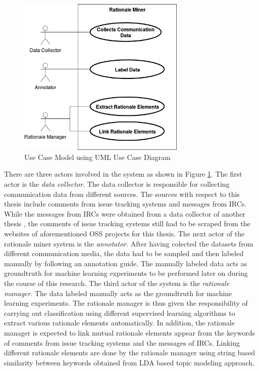 \documentclass[a4paper,12pt,twoside]{report}
\begin{document}
\begin{figure}[h] %
    \centering
    \includegraphics[width=8cm]{thesis-use-case}
    \caption{Use Case Model using UML Use Case Diagram}
    \label{fig:usecaseModel}
\end{figure}
\noindent \newline
There are three actors involved in the system as shown in Figure \ref{fig:usecaseModel}. The first actor is the \textit{data collector}. The data collector is responsible for collecting communication data from different sources. The sources with respect to this thesis include comments from issue tracking systems and messages from \acs{IRC}s. While the messages from \acs{IRC}s were obtained from a data collector of another thesis \cite{Nonnenmacher2017}, the comments of issue tracking systems still had to be scraped from the websites of aforementioned \acs{OSS} projects for this thesis. 
\newline \newline
The next actor of the rationale miner system is the \textit{annotator}. After having colected the datasets from different communication media, the data had to be sampled and then labeled manually by following an annotation guide. The manually labeled data acts as groundtruth for machine learning experiments to be performed later on during the course of this research.
\newline \newline
The third actor of the system is the \textit{rationale manager}. The data labeled manually acts as the groundtruth for machine learning experiments. The rationale manager is thus given the responsibility of carrying out classification using different supervised learning algorithms to extract various rationale elements automatically. In addition, the rationale manager is expected to link mutual rationale elements appear from the keywords of comments from issue tracking systems and the messages of \acs{IRC}s. Linking different rationale elements are done by the rationale manager using string based similarity between keywords obtained from \acs{LDA} based topic modeling approach. 
\end{document}
